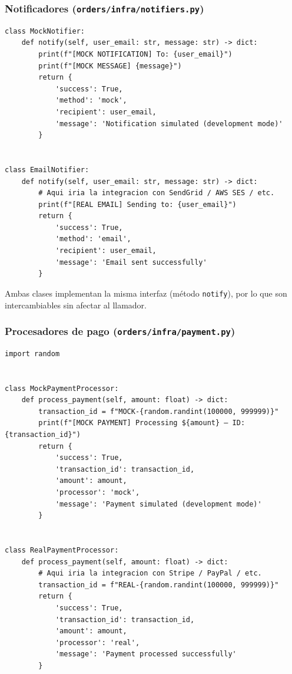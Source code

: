 \documentclass[12pt, a4paper]{article}
\begin{document}
\subsubsection{Notificadores (\texttt{orders/infra/notifiers.py})}

\begin{lstlisting}[caption={orders/infra/notifiers.py}]
class MockNotifier:
    def notify(self, user_email: str, message: str) -> dict:
        print(f"[MOCK NOTIFICATION] To: {user_email}")
        print(f"[MOCK MESSAGE] {message}")
        return {
            'success': True,
            'method': 'mock',
            'recipient': user_email,
            'message': 'Notification simulated (development mode)'
        }


class EmailNotifier:
    def notify(self, user_email: str, message: str) -> dict:
        # Aqui iria la integracion con SendGrid / AWS SES / etc.
        print(f"[REAL EMAIL] Sending to: {user_email}")
        return {
            'success': True,
            'method': 'email',
            'recipient': user_email,
            'message': 'Email sent successfully'
        }
\end{lstlisting}

Ambas clases implementan la misma interfaz (método \texttt{notify}), por lo que son intercambiables sin afectar al llamador.

\subsubsection{Procesadores de pago (\texttt{orders/infra/payment.py})}

\begin{lstlisting}[caption={orders/infra/payment.py}]
import random


class MockPaymentProcessor:
    def process_payment(self, amount: float) -> dict:
        transaction_id = f"MOCK-{random.randint(100000, 999999)}"
        print(f"[MOCK PAYMENT] Processing ${amount} — ID: {transaction_id}")
        return {
            'success': True,
            'transaction_id': transaction_id,
            'amount': amount,
            'processor': 'mock',
            'message': 'Payment simulated (development mode)'
        }


class RealPaymentProcessor:
    def process_payment(self, amount: float) -> dict:
        # Aqui iria la integracion con Stripe / PayPal / etc.
        transaction_id = f"REAL-{random.randint(100000, 999999)}"
        return {
            'success': True,
            'transaction_id': transaction_id,
            'amount': amount,
            'processor': 'real',
            'message': 'Payment processed successfully'
        }
\end{lstlisting}
\end{document}
